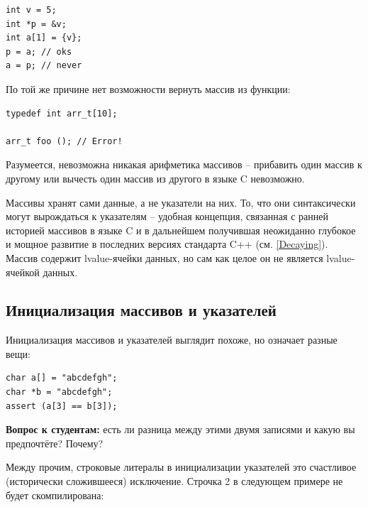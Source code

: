 \documentclass[a4paper,12pt,oneside]{book}
\newif\ifanswers
\begin{document}
\begin{lstlisting}
int v = 5;
int *p = &v;
int a[1] = {v};
p = a; // oks
a = p; // never
\end{lstlisting}

По той же причине нет возможности вернуть массив из функции:

\begin{lstlisting}
typedef int arr_t[10];

arr_t foo (); // Error!
\end{lstlisting}

Разумеется, невозможна никакая арифметика массивов -- прибавить один массив к другому или вычесть один массив из другого в языке C невозможно.

Массивы хранят сами данные, а не указатели на них. То, что они синтаксически могут вырождаться к указателям -- удобная концепция, связанная с ранней историей массивов в языке C и в дальнейшем получившая неожиданно глубокое и мощное развитие в последних версиях стандарта C++ (см. \ref{Decaying}). Массив содержит lvalue-ячейки данных, но сам как целое он не является lvalue-ячейкой данных.

\subsection{Инициализация массивов и указателей}

Инициализация массивов и указателей выглядит похоже, но означает разные вещи:

\begin{lstlisting}
char a[] = "abcdefgh";
char *b = "abcdefgh";
assert (a[3] == b[3]);
\end{lstlisting}

\textbf{Вопрос к студентам:} есть ли разница между этими двумя записями и какую вы предпочтёте? Почему?

\ifanswers
Верный ответ: строчка 1 предпочтительней, чем (устаревшая, с Wall + Werror выдаст ``error: deprecated conversion from string constant to \lstinline!char*!'') строчка 2 и они имеют разную семантику. Память под массивы выделяется автоматически (и строчка 1 подразумевает неявный memset) но память никогда автоматически не выделяется под указатели, поэтому для построения динамических структур данных (например, связных списков) используются указатели, а не массивы.
\fi

Между прочим, строковые литералы в инициализации указателей это счастливое (исторически сложившееся) исключение. Строчка 2 в следующем примере не будет скомпилирована:
\end{document}
